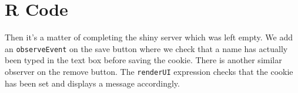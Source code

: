 \documentclass[
]{krantz}
\makeatletter
\newenvironment{Shaded}{\begin{snugshade}}{\end{snugshade}}
\newcommand{\AttributeTok}[1]{\textcolor[rgb]{0.61,0.61,0.61}{#1}}
\newcommand{\CommentTok}[1]{\textcolor[rgb]{0.37,0.37,0.37}{\textit{#1}}}
\newcommand{\KeywordTok}[1]{\textcolor[rgb]{0.27,0.27,0.27}{\textbf{#1}}}
\newcommand{\NormalTok}[1]{#1}
\newcommand{\OperatorTok}[1]{\textcolor[rgb]{0.43,0.43,0.43}{\textbf{#1}}}
\newcommand{\StringTok}[1]{\textcolor[rgb]{0.5,0.5,0.5}{#1}}
\newenvironment{kframe}{%
\medskip{}
\setlength{\fboxsep}{.8em}
 \def\at@end@of@kframe{}%
 \ifinner\ifhmode%
  \def\at@end@of@kframe{\end{minipage}}%
  \begin{minipage}{\columnwidth}%
 \fi\fi%
 \def\FrameCommand##1{\hskip\@totalleftmargin \hskip-\fboxsep
 \colorbox{shadecolor}{##1}\hskip-\fboxsep
     \hskip-\linewidth \hskip-\@totalleftmargin \hskip\columnwidth}%
 \MakeFramed {\advance\hsize-\width
   \@totalleftmargin\z@ \linewidth\hsize
   \@setminipage}}%
 {\par\unskip\endMakeFramed%
 \at@end@of@kframe}
\renewenvironment{Shaded}{\begin{kframe}}{\end{kframe}}
\makeatother
\begin{document}
\begin{Shaded}
\end{Shaded}

\hypertarget{shiny-cookies-r-code}{%
\section{R Code}\label{shiny-cookies-r-code}}

Then it's a matter of completing the shiny server which was left empty. We add an \texttt{observeEvent} on the save button where we check that a name has actually been typed in the text box before saving the cookie. There is another similar observer on the remove button. The \texttt{renderUI} expression checks that the cookie has been set and displays a message accordingly.
\end{document}
